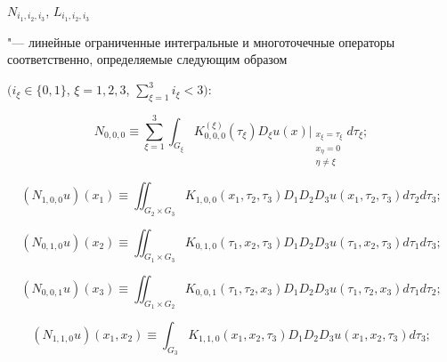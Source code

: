%





%

$N_{i_1  ,i_2  ,i_3  }$, $L_{i_1  ,i_2  ,i_3  }$ %

"--- линейные ограниченные интегральные и многоточечные операторы соответственно, оп\-ределяемые следующим образом

$\bigl(i_\xi \in\{0, 1\}$, $\xi =1, 2, 3$, $\sum _{\xi =1}^{3}i_\xi   <3\bigr)$:

\[

N_{0, 0, 0}\equiv \sum\limits_{\xi =1}^{3} \int_{G_{\xi

}}K_{0, 0, 0}^{(\xi )}\left( \tau _\xi \right) D_\xi u(x)

\Bigr\vert _{\substack{ x_\xi =\tau _\xi  \\ x_{\eta }=0 \\ \eta \neq

\xi }}d\tau _\xi ;

\]

\[

(N_{1, 0, 0} u)(x_1)\equiv \iint _{G_2  \times G_3  }K_{1, 0, 0} \left(x_1  ,\tau _2  ,\tau _3  \right)D_1   D_2   D_3  u\left(x_1  ,\tau _2  ,\tau _3  \right)d\tau _2  d\tau _3  ;

\]

\[

\left(N_{0, 1, 0} u\right)(x_2)\equiv \iint _{G_1  \times G_3  }K_{0, 1, 0} \left(\tau _1  ,x_2  ,\tau _3  \right)D_1   D_2   D_3  u\left(\tau _1  ,x_2  ,\tau _3  \right)d\tau _1  d\tau _3  ;

\]

\[

\left(N_{0, 0, 1} u\right)(x_3)\equiv \iint _{G_1  \times G_2  }K_{0, 0, 1} \left(\tau _1  ,\tau _2  ,x_3  \right)D_1   D_2   D_3  u\left(\tau _1  ,\tau _2  ,x_3  \right)d\tau _1  d\tau _2  ;

\]

\[

\left(N_{1, 1, 0} u\right)\left(x_1  ,x_2  \right)\equiv \int _{G_3  }K_{1, 1, 0} \left(x_1  ,x_2  ,\tau _3  \right)D_1   D_2   D_3  u\left(x_1  ,x_2  ,\tau _3  \right)d\tau _3  ;

\]

